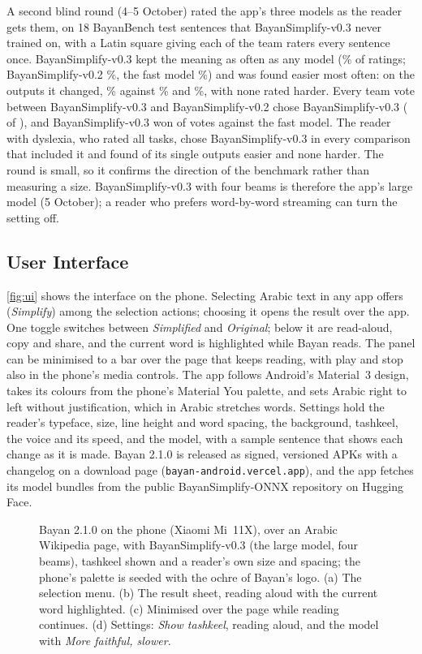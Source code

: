\documentclass[10pt,a4paper]{article}
\newcommand{\vTwo}{BayanSimplify-v0.2}
\newcommand{\vThree}{BayanSimplify-v0.3}
\begin{document}
 A second blind round (4--5 October) rated the app's three
models as the reader gets them, on 18 BayanBench test sentences that \vThree{}
never trained on, with a Latin square giving each of the \hmRaters{} team raters
every sentence once. \vThree{} kept the meaning as often as any model
(\hmThreeSame\% of ratings; \vTwo{} \hmTwoSame\%, the fast model \hmBartSame\%)
and was found easier most often: on the outputs it changed, \hmThreeChEasier\%
against \hmTwoChEasier\% and \hmBartChEasier\%, with none rated harder. Every team
vote between \vThree{} and \vTwo{} chose \vThree{} (\hmPThreeTwoFirst{} of
\hmPThreeTwoTotal{}), and \vThree{} won \hmPThreeBartFirst{} of \hmPThreeBartTotal{}
votes against the fast model. The reader with dyslexia, who rated all
\hmReaderTotal{} tasks, chose \vThree{} in every comparison that included it and
found \hmThreeREasier{} of its \hmThreeRN{} single outputs easier and none harder.
The round is small, so it confirms the direction of the benchmark rather than
measuring a size. \vThree{} with four beams is therefore the app's
large model (5 October); a reader who prefers word-by-word streaming can turn the
setting off.

\subsection{User Interface}

\autoref{fig:ui} shows the interface on the phone. Selecting Arabic text in any
app offers  (\emph{Simplify}) among the selection actions; choosing it
opens the result over the app. One toggle switches between \emph{Simplified} and
\emph{Original}; below it are read-aloud, copy and share, and the current word is
highlighted while Bayan reads. The panel can be minimised to a bar over the page
that keeps reading, with play and stop also in the phone's media controls. The app
follows Android's Material~3 design, takes its colours from the phone's Material
You palette, and sets Arabic right to left without justification, which in Arabic
stretches words. Settings hold the reader's typeface, size, line height and word
spacing, the background, tashkeel, the voice and its speed, and the model, with a
sample sentence that shows each change as it is made. Bayan 2.1.0 is released as
signed, versioned APKs with a changelog on a download page
(\texttt{bayan-android.vercel.app}), and the app fetches its model bundles from the
public BayanSimplify-ONNX repository on Hugging Face.

\begin{figure}[h]
\centering
\figui
\caption{Bayan 2.1.0 on the phone (Xiaomi Mi~11X), over an Arabic Wikipedia page, with
\vThree{} (the large model, four beams), tashkeel shown and a reader's own size and
spacing; the phone's palette is seeded with the ochre of Bayan's logo. (a) The
selection menu. (b) The result sheet, reading aloud with the current word
highlighted. (c) Minimised over the page while reading continues. (d) Settings:
\emph{Show tashkeel}, reading aloud, and the model with \emph{More faithful, slower}.}
\label{fig:ui}
\end{figure}
\end{document}
